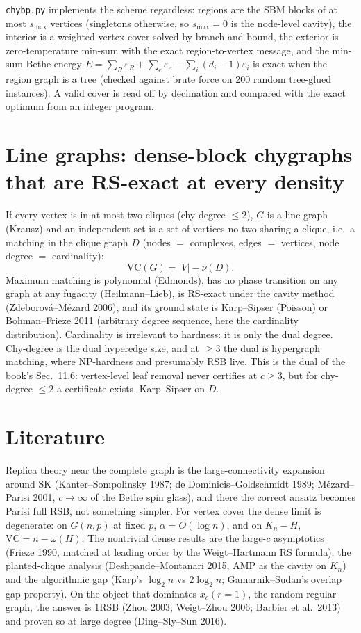 \documentclass[11pt]{article}
\newcommand{\VC}{\mathrm{VC}}
\begin{document}
\texttt{chybp.py} implements the scheme regardless: regions are the SBM
blocks of at most $s_{\max}$ vertices (singletons otherwise, so $s_{\max}=0$
is the node-level cavity), the interior is a weighted vertex cover solved by
branch and bound, the exterior is zero-temperature min-sum with the exact
region-to-vertex message, and the min-sum Bethe energy
$E=\sum_R\varepsilon_R+\sum_e\varepsilon_e-\sum_i(d_i-1)\varepsilon_i$ is
exact when the region graph is a tree (checked against brute force on 200
random tree-glued instances). A valid cover is read off by decimation and
compared with the exact optimum from an integer program.



\section{Line graphs: dense-block chygraphs that are RS-exact at every density}

If every vertex is in at most two cliques (chy-degree $\le2$), $G$ is a line
graph (Krausz) and an independent set is a set of vertices no two sharing a
clique, i.e.\ a matching in the clique graph $D$ (nodes $=$ complexes, edges
$=$ vertices, node degree $=$ cardinality):
\begin{equation}
  \VC(G)=|V|-\nu(D).
\end{equation}
Maximum matching is polynomial (Edmonds), has no phase transition on any
graph at any fugacity (Heilmann--Lieb), is RS-exact under the cavity method
(Zdeborov\'a--M\'ezard 2006), and its ground state is Karp--Sipser (Poisson) or
Bohman--Frieze 2011 (arbitrary degree sequence, here the cardinality
distribution). Cardinality is irrelevant to hardness: it is only the dual
degree. Chy-degree is the dual hyperedge size, and at $\ge3$ the dual is
hypergraph matching, where NP-hardness and presumably RSB live. This is the
dual of the book's Sec.~11.6: vertex-level leaf removal never certifies at
$c\ge3$, but for chy-degree $\le2$ a certificate exists, Karp--Sipser on $D$.

\section{Literature}

Replica theory near the complete graph is the large-connectivity expansion
around SK (Kanter--Sompolinsky 1987; de Dominicis--Goldschmidt 1989;
M\'ezard--Parisi 2001, $c\to\infty$ of the Bethe spin glass), and there the
correct ansatz becomes Parisi full RSB, not something simpler. For vertex
cover the dense limit is degenerate: on $G(n,p)$ at fixed $p$,
$\alpha=O(\log n)$, and on $K_n-H$, $\VC=n-\omega(H)$. The nontrivial dense
results are the large-$c$ asymptotics (Frieze 1990, matched at leading order
by the Weigt--Hartmann RS formula), the planted-clique analysis
(Deshpande--Montanari 2015, AMP as the cavity on $K_n$) and the algorithmic
gap (Karp's $\log_2n$ vs $2\log_2n$; Gamarnik--Sudan's overlap gap property).
On the object that dominates $x_c(r=1)$, the random regular graph, the
answer is 1RSB (Zhou 2003; Weigt--Zhou 2006; Barbier et al.\ 2013) and proven
so at large degree (Ding--Sly--Sun 2016).
\end{document}
